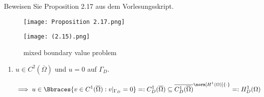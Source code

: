 
\begin{exercise}

Beweisen Sie Proposition 2.17 aus dem Vorlesungsskript.

\end{exercise}


\begin{solution}

\phantom{}

\begin{figure}[h!]
    \centering
    \texttt{[image: Proposition 2.17.png]}
\end{figure}

\begin{figure}[h!]
    \begin{boxedin}
        \begin{center}
            \hspace{4 cm}
            \texttt{[image: (2.15).png]}
            \caption{mixed boundary value problem}
        \end{center}
    \end{boxedin}
\end{figure}

\begin{enumerate}[label = (\roman*)]

    \item $u \in C^2(\overline{\Omega})$ und $u = 0$ auf $\Gamma_D$.

    \begin{align*}
        \implies
        u
        \in
        \Bbraces{v \in C^1(\overline{\Omega}): v|_{\Gamma_D} = 0}
        =:
        C_D^1(\overline{\Omega})
        \subseteq
        \overline
        {
            C_D^1(\overline{\Omega})
        }^{
            \norm[H^1(\Omega)]{\cdot}
        }
        =:
        H^1_D(\Omega)
    \end{align*}


\end{enumerate}
\end{solution}
